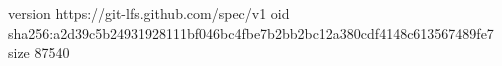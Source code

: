 version https://git-lfs.github.com/spec/v1
oid sha256:a2d39c5b24931928111bf046bc4fbe7b2bb2bc12a380cdf4148c613567489fe7
size 87540
